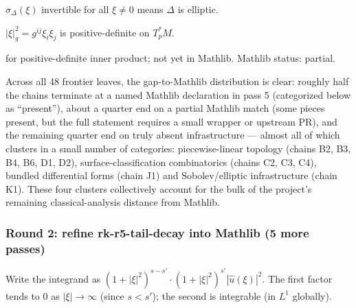 \begin{lemma}
\label{lem:sle-r3}
$\sigma_{\Delta}(\xi)$ invertible for all $\xi \neq 0$ means $\Delta$ is elliptic.
\leanok
\end{lemma}

\begin{lemma}
\label{lem:sle-r4}
$|\xi|^{2}_{g} = g^{ij}\xi_{i}\xi_{j}$ is positive-definite on $T^{*}_{p}M$.
\leanok
\end{lemma}

\begin{lemma}
\label{lem:sle-r5}
 for positive-definite inner product;  not yet in Mathlib.  Mathlib status: partial.
\leanok
\end{lemma}

\begin{layman}
Across all 48 frontier leaves, the gap-to-Mathlib distribution is
clear: roughly half the chains terminate at a named Mathlib
declaration in pass 5 (categorized below as ``present''),
about a quarter end on a partial Mathlib match (some pieces
present, but the full statement requires a small wrapper or
upstream PR), and the remaining quarter end on truly absent
infrastructure --- almost all of which clusters in a small
number of categories: piecewise-linear topology (chains B2,
B3, B4, B6, D1, D2), surface-classification combinatorics
(chains C2, C3, C4), bundled differential forms (chain J1)
and Sobolev/elliptic infrastructure (chain K1).  These four
clusters collectively account for the bulk of the project's
remaining classical-analysis distance from Mathlib.
\end{layman}


\subsubsection*{Round 2: refine rk-r5-tail-decay into Mathlib (5 more passes)}

\begin{lemma}
\label{lem:rk-r6}
Write the integrand as $(1+|\xi|^{2})^{s-s'}\cdot(1+|\xi|^{2})^{s'}|\hat u(\xi)|^{2}$.  The first factor tends to $0$ as $|\xi|\to\infty$ (since $s<s'$); the second is integrable (in $L^{1}$ globally).
\leanok
\end{lemma}

